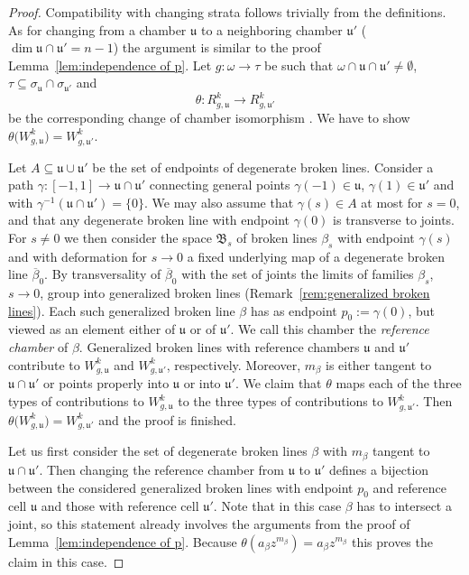 \documentclass[11pt,letter]{amsart}
\theoremstyle{definition}
\theoremstyle{remark}
\numberwithin{equation}{section}
\numberwithin{figure}{section}
\newcommand {\foB}  {\mathfrak{B}}
\newcommand {\fou}  {\mathfrak{u}}
\newcommand {\lra}  {\longrightarrow}
\begin{document}
\begin{proof}
Compatibility with changing strata follows trivially from the definitions. As
for changing from a chamber $\fou$ to a neighboring chamber $\fou'$ ($\dim
\fou\cap \fou'=n-1$) the argument is similar to the proof
Lemma~\ref{lem:independence of p}. Let $g:\omega\to\tau$ be such that
$\omega\cap\fou \cap\fou' \neq\emptyset$, $\tau\subseteq
\sigma_\fou\cap\sigma_{\fou'}$ and
\[
	\theta: R^k_{g,\fou}\lra R^k_{g,\fou'}
\]
be the corresponding change of chamber isomorphism \cite[\S2.4]{affinecomplex}.
We have to show $\theta \big(W^k_{g,\fou}\big) = W^k_{g,\fou'}$.

Let $A\subseteq \fou\cup\fou'$ be the set of endpoints of degenerate broken
lines. Consider a path $\gamma:[-1,1]\to \fou\cap\fou'$ connecting general
points $\gamma(-1)\in\fou$, $\gamma(1)\in \fou'$ and with
$\gamma^{-1}(\fou\cap\fou')=\{0\}$. We may also assume that $\gamma(s)\in A$ at
most for $s=0$, and that any degenerate broken line with endpoint $\gamma(0)$ is
transverse to joints. For $s\neq 0$ we then consider the space $\foB_s$ of
broken lines $\beta_s$ with endpoint $\gamma(s)$ and with deformation for $s\to
0$ a fixed underlying map of a degenerate broken line $\overline\beta_0$. By
transversality of $\overline\beta_0$ with the set of joints the limits of
families $\beta_s$, $s\to 0$, group into generalized broken lines
(Remark~\ref{rem:generalized broken lines}). Each such generalized broken line
$\beta$ has as endpoint $p_0:= \gamma(0)$, but viewed as an element either of
$\fou$ or of $\fou'$. We call this chamber the \emph{reference chamber} of
$\beta$. Generalized broken lines with reference chambers $\fou$ and $\fou'$
contribute to $W^k_{g,\fou}$ and $W^k_{g,\fou'}$, respectively. Moreover,
$m_\beta$ is either tangent to $\fou\cap\fou'$ or points properly into $\fou$ or
into $\fou'$. We claim that $\theta$ maps each of the three types of
contributions to $W^k_{g,\fou}$ to the three types of contributions to
$W^k_{g,\fou'}$. Then $\theta \big(W^k_{g,\fou}\big) = W^k_{g,\fou'}$ and the
proof is finished.

Let us first consider the set of degenerate broken lines $\beta$ with
$m_\beta$ tangent to $\fou\cap\fou'$. Then changing the reference
chamber from $\fou$ to $\fou'$ defines a bijection between the
considered generalized broken lines with endpoint $p_0$ and reference
cell $\fou$ and those with reference cell $\fou'$. Note that in
this case $\beta$ has to intersect a joint, so this statement
already involves the arguments from the proof of
Lemma~\ref{lem:independence of p}. Because $\theta(a_\beta
z^{m_\beta})= a_\beta z^{m_\beta}$ this proves the claim in this case. 


\end{proof}
\end{document}
